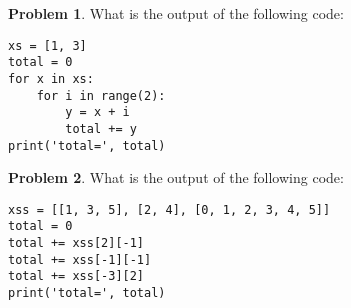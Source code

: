 \documentclass[10pt]{article}
\theoremstyle{definition}
\newtheorem{problem}{Problem}
\begin{document}
\begin{problem}
    What is the output of the following code:
\end{problem}
\begin{lstlisting}
xs = [1, 3]
total = 0
for x in xs:
    for i in range(2):
        y = x + i
        total += y
print('total=', total)
\end{lstlisting}
\vspace{1.5in}

\begin{problem}
    What is the output of the following code:
\end{problem}
\begin{lstlisting}
xss = [[1, 3, 5], [2, 4], [0, 1, 2, 3, 4, 5]]
total = 0
total += xss[2][-1]
total += xss[-1][-1]
total += xss[-3][2]
print('total=', total)
\end{lstlisting}
\vspace{1.5in}
\end{document}
